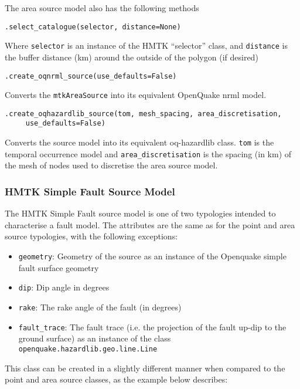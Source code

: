 The area source model also has the following methods

\verb;.select_catalogue(selector, distance=None);

Where \verb=selector= is an instance of the HMTK ``selector'' class, and \verb=distance= is the buffer distance (km) around the outside of the polygon (if desired)


\verb;.create_oqnrml_source(use_defaults=False);

Converts the \verb=mtkAreaSource= into its equivalent OpenQuake nrml model.

\verb;.create_oqhazardlib_source(tom, mesh_spacing, area_discretisation,;\\
\verb;     use_defaults=False);

Converts the source model into its equivalent oq-hazardlib class. \verb=tom= is the temporal occurrence model and \verb=area_discretisation= is the spacing (in km) of the mesh of nodes used to discretise the area source model.


\subsubsection{HMTK Simple Fault Source Model}

The HMTK Simple Fault source model is one of two typologies intended to characterise a fault model. The attributes are the same as for the point and area source typologies, with the following exceptions:


\begin{itemize}
\item \verb=geometry=: Geometry of the source as an instance of the Openquake simple fault surface geometry
\item \verb=dip=: Dip angle in degrees
\item \verb=rake=: The rake angle of the fault (in degrees)
\item \verb=fault_trace=: The fault trace (i.e. the projection of the fault up-dip to the ground surface) as an instance of the class \verb=openquake.hazardlib.geo.line.Line=
\end{itemize}

This class can be created in a slightly different manner when compared to the point and area source classes, as the example below describes:

